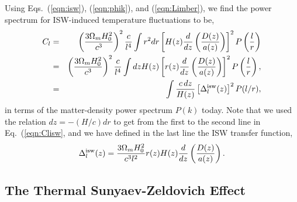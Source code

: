 \documentclass[aps,twocolumn,floats,prd,nofootinbib]{revtex4-1}
\begin{document}
Using Eqs.~(\ref{eqn:isw}), (\ref{eqn:phik}), and
(\ref{eqn:Limber}), we find the power spectrum for ISW-induced
temperature fluctuations to be,
\begin{eqnarray}
     C_l & = & \left(\frac{3 \Omega_m H_0^2}{c^3} \right)^2
     \frac{c}{l^4} \int r^2  dr \left[ H(z) \frac{d}{dz}
     \left( \frac{D(z)}{a(z)} \right) \right]^2 P\left(\frac{l}{r}
     \right) \nonumber \\ 
        & = & \left(\frac{3 \Omega_m H_0^2}{c^3} \right)^2
     \frac{c}{l^4} \int  dz H(z) \left[r(z) \frac{d}{dz}
     \left( \frac{D(z)}{a(z)} \right) \right]^2 P\left(\frac{l}{r}
     \right), \nonumber \\
     & = &  \int \frac{c\, dz}{H(z)} \left[ \Delta^{\rm
     isw}_l(z)\right]^2 P(l/r),
\label{eqn:Clisw}
\end{eqnarray}
in terms of the matter-density power spectrum $P(k)$ today.
Note that we used the relation $dz = -(H/c) dr$ to get from the
first to the second line in Eq.~(\ref{eqn:Clisw}, and we have
defined in the last line the ISW transfer function,
\begin{equation}
     \Delta^{\rm isw}_l(z) = \frac{3 \Omega_m H_0^2}{c^3 l^2}
     r(z) H(z) \frac{d}{dz}
     \left( \frac{D(z)}{a(z)} \right).
\label{eqn:iswtransfer}
\end{equation}


\subsection{The Thermal Sunyaev-Zeldovich Effect}
\end{document}

